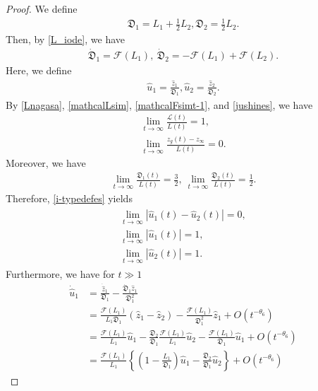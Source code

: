 \documentclass[reqno]{amsart}
\theoremstyle{plain}
\theoremstyle{definition}
\numberwithin{equation}{section}
\begin{document}
\begin{proof}
We define 
\begin{align*}
\mathfrak{D}_1=L_1+\frac{1}{2}L_2, \mathfrak{D}_2=\frac{1}{2}L_2.
\end{align*}
Then, by \eqref{L_iode}, we have
\begin{align*}
\dot{\mathfrak{D}}_1=\mathcal{F}(L_1),\ \dot{\mathfrak{D}}_2=-\mathcal{F}(L_1)+\mathcal{F}(L_2).
\end{align*}
Here, we define
\begin{align*}
\hat{u}_1=\frac{\hat{z}_1}{\mathfrak{D}_1}, \hat{u}_2=\frac{\hat{z}_2}{\mathfrak{D}_2}.
\end{align*}
By \eqref{Lnagasa}, \eqref{mathcalLsim}, \eqref{mathcalFsimt-1}, and \eqref{jushines}, we have
\begin{align*}
\lim_{t\to\infty}\frac{\mathcal{L}(t)}{L(t)}=1,
\\
\lim_{t\to\infty}\frac{z_g(t)-z_{\infty}}{L(t)}=0.
\end{align*}
Moreover, we have
\begin{align*}
\lim_{t\to\infty}\frac{\mathfrak{D}_1(t)}{L(t)}=\frac{3}{2},\ \lim_{t\to\infty}\frac{\mathfrak{D}_2(t)}{L(t)}=\frac{1}{2}.
\end{align*}
Therefore, \eqref{i-typedefes} yields
\begin{align}\label{hatusalim}
\begin{aligned}
\lim_{t\to\infty}\left|\hat{u}_1(t)-\hat{u}_2(t)\right|=0,
\\
\lim_{t\to\infty}\left|\hat{u}_1(t)\right|=1,
\\
\lim_{t\to\infty}\left|\hat{u}_2(t)\right|=1.
\end{aligned}
\end{align}
Furthermore, we have for $t\gg 1$
\begin{align*}
\dot{\hat{u}}_1&=\frac{\dot{\hat{z}}_1}{\mathfrak{D}_1}-\frac{\dot{\mathfrak{D}}_1\hat{z}_1}{\mathfrak{D}_1^2}
\\
&=\frac{\mathcal{F}(L_1)}{L_1\mathfrak{D}_1}\left(\hat{z}_1-\hat{z}_2\right)-\frac{\mathcal{F}(L_1)}{\mathfrak{D}_1^2}\hat{z}_1+O\left(t^{-\theta_6}\right)
\\
&=\frac{\mathcal{F}(L_1)}{L_1}\hat{u}_1-\frac{\mathfrak{D}_2}{\mathfrak{D}_1}\frac{\mathcal{F}(L_1)}{L_1}\hat{u}_2-\frac{\mathcal{F}(L_1)}{\mathfrak{D}_1}\hat{u}_1+O\left(t^{-\theta_6}\right)
\\
&=\frac{\mathcal{F}(L_1)}{L_1}\left\{\left(1-\frac{L_1}{\mathfrak{D}_1}\right)\hat{u}_1-\frac{\mathfrak{D}_2}{\mathfrak{D}_1}\hat{u}_2\right\}+O\left(t^{-\theta_6}\right)

\end{align*}
\end{proof}
\end{document}

